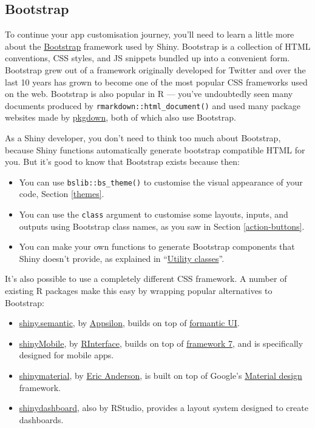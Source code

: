 \documentclass[
]{article}
\begin{document}
\hypertarget{bootstrap}{%
\subsection{Bootstrap}\label{bootstrap}}

To continue your app customisation journey, you'll need to learn a little more about the \href{https://getbootstrap.com}{Bootstrap} framework used by Shiny.
Bootstrap is a collection of HTML conventions, CSS styles, and JS snippets bundled up into a convenient form.
Bootstrap grew out of a framework originally developed for Twitter and over the last 10 years has grown to become one of the most popular CSS frameworks used on the web.
Bootstrap is also popular in R --- you've undoubtedly seen many documents produced by \texttt{rmarkdown::html\_document()} and used many package websites made by \href{http://pkgdown.r-lib.org/}{pkgdown}, both of which also use Bootstrap.

As a Shiny developer, you don't need to think too much about Bootstrap, because Shiny functions automatically generate bootstrap compatible HTML for you.
But it's good to know that Bootstrap exists because then:

\begin{itemize}
\item
  You can use \texttt{bslib::bs\_theme()} to customise the visual appearance of your code, Section \ref{themes}.
\item
  You can use the \texttt{class} argument to customise some layouts, inputs, and outputs using Bootstrap class names, as you saw in Section \ref{action-buttons}.
\item
  You can make your own functions to generate Bootstrap components that Shiny doesn't provide, as explained in ``\href{https://rstudio.github.io/bslib/articles/theming.html\#utility-classes}{Utility classes}''.
\end{itemize}

It's also possible to use a completely different CSS framework.
A number of existing R packages make this easy by wrapping popular alternatives to Bootstrap:

\begin{itemize}
\item
  \href{https://appsilon.github.io/shiny.semantic/}{shiny.semantic}, by \href{https://appsilon.com/}{Appsilon}, builds on top of \href{https://fomantic-ui.com}{formantic UI}.
\item
  \href{https://github.com/RinteRface/shinyMobile}{shinyMobile}, by \href{https://rinterface.com}{RInterface}, builds on top of \href{https://framework7.io}{framework 7}, and is specifically designed for mobile apps.
\item
  \href{https://ericrayanderson.github.io/shinymaterial/}{shinymaterial}, by \href{https://github.com/ericrayanderson}{Eric Anderson}, is built on top of Google's \href{https://material.io/design}{Material design} framework.
\item
  \href{https://rstudio.github.io/shinydashboard/}{shinydashboard}, also by RStudio, provides a layout system designed to create dashboards.
\end{itemize}
\end{document}
